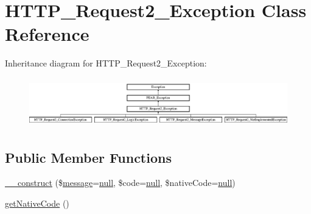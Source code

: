\hypertarget{classHTTP__Request2__Exception}{}\section{H\+T\+T\+P\+\_\+\+Request2\+\_\+\+Exception Class Reference}
\label{classHTTP__Request2__Exception}
Inheritance diagram for H\+T\+T\+P\+\_\+\+Request2\+\_\+\+Exception\+:\begin{figure}[H]
\begin{center}
\leavevmode
\includegraphics[height=2.162162cm]{classHTTP__Request2__Exception}
\end{center}
\end{figure}
\subsection*{Public Member Functions}
\begin{DoxyCompactItemize}
\item 
\hyperlink{classHTTP__Request2__Exception_a47da8c63916bdd299dc2c23b03f01bed}{\+\_\+\+\_\+construct} (\$\hyperlink{classmessage}{message}=\hyperlink{modernizr_8min_8js_a286f9ec831c5e676eeb493248eab9575}{null}, \$code=\hyperlink{modernizr_8min_8js_a286f9ec831c5e676eeb493248eab9575}{null}, \$native\+Code=\hyperlink{modernizr_8min_8js_a286f9ec831c5e676eeb493248eab9575}{null})
\item 
\hyperlink{classHTTP__Request2__Exception_a9d09eee1bf0232f394fd9f842c939d45}{get\+Native\+Code} ()
\end{DoxyCompactItemize}
